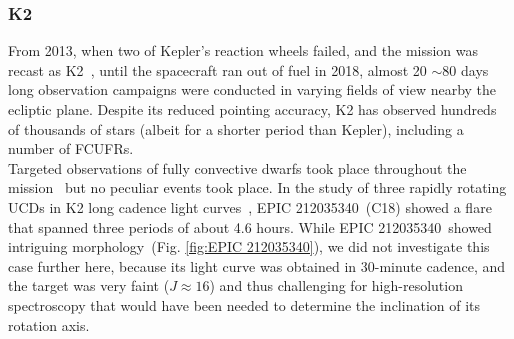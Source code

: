 \documentclass[fleqn,usenatbib,letters]{mnras}%
\newcommand{\FD}{EPIC 212035340} %
\begin{document}
\subsubsection{K2}
\label{sec:photometryK2}
From 2013, when two of Kepler's reaction wheels failed, and the mission was recast as K2~\citep{howell2014}, until the spacecraft ran out of fuel in 2018, almost 20 $\sim$80
days long observation campaigns were conducted in varying fields of view nearby the ecliptic plane. Despite its reduced pointing accuracy, K2 has observed hundreds of thousands of stars (albeit for a shorter period than Kepler), including a number of FCUFRs.
\\
Targeted observations of fully convective dwarfs took place throughout the mission~\citep{gizis2017, gizis2017b, paudel2018} but no peculiar events took place.
In the study of three rapidly rotating UCDs in K2 long cadence light curves~\citep{paudel2019}, %
\FD~(C18) showed a flare that spanned three periods of about 4.6 hours.
While
\FD~showed intriguing morphology~(Fig. \ref{fig:\FD}), we did not investigate this case further here, because its light curve was obtained in 30-minute cadence, and the target was very faint ($J\approx 16$) and thus challenging for high-resolution spectroscopy that would have been needed to determine the inclination of its rotation axis.
\end{document}

